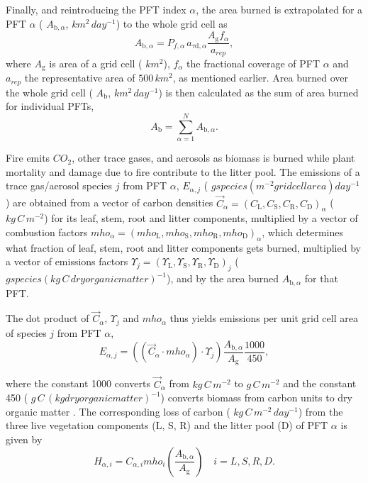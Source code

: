 Finally, and reintroducing the P\+F\+T index $\alpha$, the area burned is extrapolated for a P\+F\+T $\alpha$ ( $A_{\mathrm{b},\alpha}$, $km^2\,day^{-1}$) to the whole grid cell as \[A_{\mathrm{b},\alpha}=P_{f,\alpha}\,a_{\tau \mathrm{d},\alpha} \frac{A_\mathrm{g}f_\alpha}{a_{rep}}, \] where $A_\mathrm{g}$ is area of a grid cell ( $km^2$), $f_\alpha$ the fractional coverage of P\+F\+T $\alpha$ and $a_{rep}$ the representative area of $500\,km^2$, as mentioned earlier. Area burned over the whole grid cell ( $A_\mathrm{b}$, $km^2\,day^{-1}$) is then calculated as the sum of area burned for individual P\+F\+Ts, \[ A_\mathrm{b}=\sum_{\alpha=1}^{N}A_{\mathrm{b},\alpha}.\]

Fire emits $CO_2$, other trace gases, and aerosols as biomass is burned while plant mortality and damage due to fire contribute to the litter pool. The emissions of a trace gas/aerosol species $j$ from P\+F\+T $\alpha$, $E_{\alpha,j}$ ( $g species (m^{-2} grid cell area) day^{-1}$) are obtained from a vector of carbon densities $\vec{C}_{\alpha} = (C_\mathrm{L}, C_\mathrm{S}, C_\mathrm{R}, C_\mathrm{D})_\alpha$ ( $kg\,C\,m^{-2}$) for its leaf, stem, root and litter components, multiplied by a vector of combustion factors $mho_{\alpha} = (mho_\mathrm{L}, mho_\mathrm{S}, mho_\mathrm{R}, mho_\mathrm{D})_\alpha$, which determines what fraction of leaf, stem, root and litter components gets burned, multiplied by a vector of emissions factors $\Upsilon_{j} = (\Upsilon_\mathrm{L}, \Upsilon_\mathrm{S}, \Upsilon_\mathrm{R}, \Upsilon_\mathrm{D})_j$ ( $g species (kg\,C\,dry organic matter)^{-1}$), and by the area burned $A_{\mathrm{b},\alpha}$ for that P\+F\+T.

The dot product of $\vec{C}_{\alpha}$, $\Upsilon_{j}$ and $mho_{\alpha}$ thus yields emissions per unit grid cell area of species $j$ from P\+F\+T $\alpha$, \[ \label{emiss_combust_factor} {E_{\alpha,j}}= ((\vec{C}_\alpha\cdot mho_{\alpha})\cdot \Upsilon_{j}) \frac{A_{\mathrm{b},\alpha}}{A_\mathrm{g}}\frac{1000}{450}, \]

where the constant 1000 converts $\vec{C}_\alpha$ from $kg\,C\,m^{-2}$ to $g\,C\,m^{-2}$ and the constant 450 ( $g\,C\,(kg dry organic matter)^{-1}$) converts biomass from carbon units to dry organic matter \cite{Li20121c2}. The corresponding loss of carbon ( $kg\,C\,m^{-2}\,day^{-1}$) from the three live vegetation components (L, S, R) and the litter pool (D) of P\+F\+T $\alpha$ is given by \[ \label{emiss_combust_loss} H_{\alpha, i}= C_{\alpha, i} mho_i\left(\frac{A_{\mathrm{b},\alpha}}{A_\mathrm{g}}\right)\quad i={L, S, R, D}. \]

